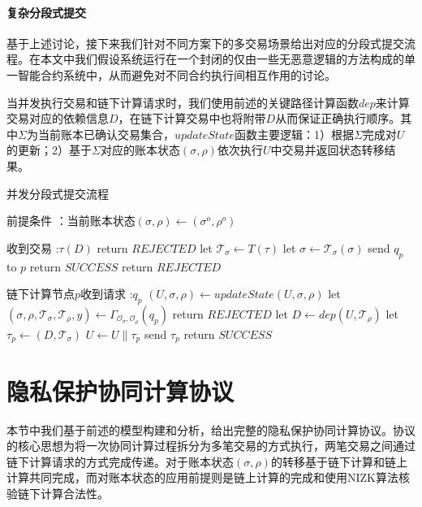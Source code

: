 \paragraph{复杂分段式提交} 基于上述讨论，接下来我们针对不同方案下的多交易场景给出对应的分段式提交流程。在本文中我们假设系统运行在一个封闭的仅由一些无恶意逻辑的方法构成的单一智能合约系统中，从而避免对不同合约执行间相互作用的讨论。

当并发执行交易和链下计算请求时，我们使用前述的关键路径计算函数$dep$来计算交易对应的依赖信息$D$，在链下计算交易中也将附带$D$从而保证正确执行顺序。其中$\Sigma$为当前账本已确认交易集合，$updateState$函数主要逻辑：1）根据$\Sigma$完成对$U$的更新；2）基于$\Sigma$对应的账本状态$(\sigma, \rho)$依次执行$U$中交易并返回状态转移结果。

\begin{breakablealgorithm}
    \caption{并发分段式提交流程}
    \label{alg:ch3-8}
    \begin{algorithmic} 
        \item[前提条件]：当前账本状态$(\sigma, \rho) \leftarrow (\sigma^o, \rho^o)$
        \item[收到交易]:$\tau(D)$
        \STATE return $REJECTED$
        \ENDIF
        \STATE let $\mathcal{T}_\sigma \leftarrow T(\tau)$
        \STATE let $\sigma \leftarrow \mathcal{T}_\sigma(\sigma)$
        \STATE send $q_p$ to $p$
        \ENDFOR
        \STATE return $SUCCESS$
        \ENDIF
        \STATE return $REJECTED$
        \item[链下计算节点$p$收到请求]:$q_p$
        \STATE $(U, \sigma, \rho) \leftarrow updateState(U, \sigma, \rho)$
        \STATE let $(\sigma, \rho, \mathcal{T}_\sigma, \mathcal{T}_\rho, y) \leftarrow \Gamma_{\mathcal{O}_\sigma, \mathcal{O}_\rho}(q_p)$
        \IF {$\sigma = \perp \vee \rho = \perp$} 
        \STATE return $REJECTED$
        \ENDIF
        \STATE let $D \leftarrow dep(U, \mathcal{T}_\rho)$
        \STATE let $\tau_p \leftarrow (D, \mathcal{T}_\sigma)$
        \STATE $U \leftarrow U \parallel \tau_p$
        \STATE send $\tau_p$
        \STATE return $SUCCESS$
    \end{algorithmic}
\end{breakablealgorithm}

\section{隐私保护协同计算协议}
本节中我们基于前述的模型构建和分析，给出完整的隐私保护协同计算协议。协议的核心思想为将一次协同计算过程拆分为多笔交易的方式执行，两笔交易之间通过链下计算请求的方式完成传递。对于账本状态$(\sigma, \rho)$的转移基于链下计算和链上计算共同完成，而对账本状态的应用前提则是链上计算的完成和使用NIZK算法核验链下计算合法性。

